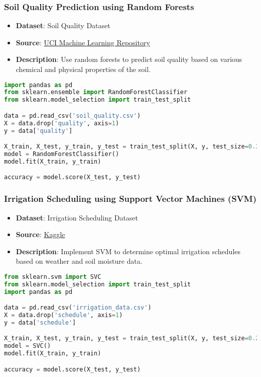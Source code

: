 \begin{frame}[fragile]\frametitle{Soil Quality Prediction using Random Forests}
    \begin{itemize}
        \item \textbf{Dataset}: Soil Quality Dataset
        \item \textbf{Source}: \href{https://archive.ics.uci.edu/ml/datasets/Soil+Quality}{UCI Machine Learning Repository}
        \item \textbf{Description}: Use random forests to predict soil quality based on various chemical and physical properties of the soil.
    \end{itemize}
    \begin{lstlisting}[language=Python]
import pandas as pd
from sklearn.ensemble import RandomForestClassifier
from sklearn.model_selection import train_test_split

data = pd.read_csv('soil_quality.csv')
X = data.drop('quality', axis=1)
y = data['quality']

X_train, X_test, y_train, y_test = train_test_split(X, y, test_size=0.3)
model = RandomForestClassifier()
model.fit(X_train, y_train)

accuracy = model.score(X_test, y_test)
    \end{lstlisting}
\end{frame}

\begin{frame}[fragile]\frametitle{Irrigation Scheduling using Support Vector Machines (SVM)}
    \begin{itemize}
        \item \textbf{Dataset}: Irrigation Scheduling Dataset
        \item \textbf{Source}: \href{https://www.kaggle.com/datasets/krishnaik06/irrigation-scheduling-dataset}{Kaggle}
        \item \textbf{Description}: Implement SVM to determine optimal irrigation schedules based on weather and soil moisture data.
    \end{itemize}
    \begin{lstlisting}[language=Python]
from sklearn.svm import SVC
from sklearn.model_selection import train_test_split
import pandas as pd

data = pd.read_csv('irrigation_data.csv')
X = data.drop('schedule', axis=1)
y = data['schedule']

X_train, X_test, y_train, y_test = train_test_split(X, y, test_size=0.2)
model = SVC()
model.fit(X_train, y_train)

accuracy = model.score(X_test, y_test)
    \end{lstlisting}
\end{frame}

